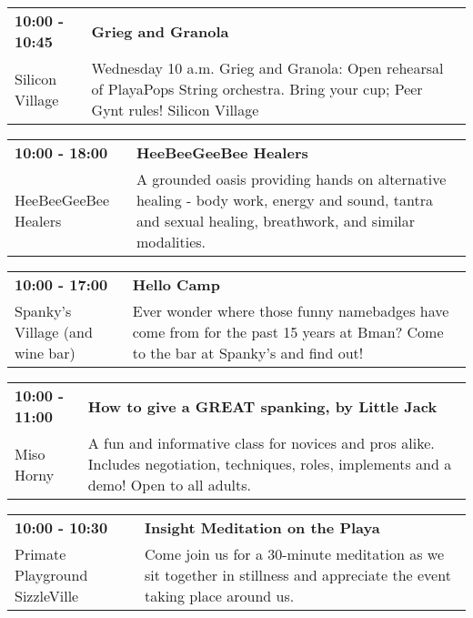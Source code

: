 \begin{tabular}{ p{1in} p{2.2in} }
    \textbf{10:00 - 10:45} & \textbf{Grieg and Granola} \\
    Silicon Village \newline  & Wednesday 10 a.m. Grieg and Granola: Open rehearsal of PlayaPops String orchestra.   Bring your cup;  Peer Gynt rules!  Silicon Village \\
    \hline 
\end{tabular}
    
\begin{tabular}{ p{1in} p{2.2in} }
    \textbf{10:00 - 18:00} & \textbf{HeeBeeGeeBee Healers} \\
    HeeBeeGeeBee Healers \newline  & A grounded oasis providing hands on alternative healing - body work, energy and sound, tantra and sexual healing, breathwork, and similar modalities. \\
    \hline 
\end{tabular}
    
\begin{tabular}{ p{1in} p{2.2in} }
    \textbf{10:00 - 17:00} & \textbf{Hello Camp} \\
    Spanky's Village (and wine bar) \newline  & Ever wonder where those funny namebadges have come from for the past 15 years at Bman?  Come to the bar at Spanky's and find out! \\
    \hline 
\end{tabular}
    
\begin{tabular}{ p{1in} p{2.2in} }
    \textbf{10:00 - 11:00} & \textbf{How to give a GREAT spanking, by Little Jack} \\
    Miso Horny \newline  & A fun and informative class for novices and pros alike. Includes negotiation, techniques, roles, implements and a demo! Open to all adults. \\
    \hline 
\end{tabular}
    
\begin{tabular}{ p{1in} p{2.2in} }
    \textbf{10:00 - 10:30} & \textbf{Insight Meditation on the Playa} \\
    Primate Playground \newline SizzleVille & Come join us for a 30-minute meditation as we sit together in stillness and appreciate the event taking place around us. \\
    \hline 
\end{tabular}
    
